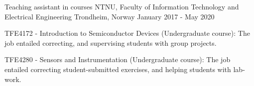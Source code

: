     \cventry
        {Teaching assistant in courses}
        {NTNU, Faculty of Information Technology and Electrical Engineering}
        {Trondheim, Norway}
        {January 2017 - May 2020}
        {      
          \begin{cvitems}
            \item {TFE4172 - Introduction to Semiconductor Devices (Undergraduate course): The job entailed correcting, and supervising students with group projects.}
            \item {TFE4280 - Sensors and Instrumentation (Undergraduate course): The job entailed correcting student-submitted exercises, and helping students with lab-work.}
          \end{cvitems}
        }
        